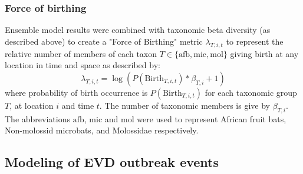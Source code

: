 \documentclass[9pt,twoside,lineno]{pnas-new}
\newcommand{\afb}{\mathrm{afb}}
\newcommand{\mic}{\mathrm{mic}}
\newcommand{\mol}{\mathrm{mol}}
\begin{document}
\subsubsection*{Force of birthing}
Ensemble model results were combined with taxonomic beta diversity (as described above) to create a "Force of Birthing" metric $\lambda_{T,i,t}$ to represent the relative number of members of each taxon $T \in \{\afb, \mic, \mol\}$ giving birth at any location in time and space as described by:
\[
  	    \lambda_{T,i,t} = \log(P(\mathrm{Birth}_{T,i,t})*\beta_{T,i} +1)
\]
where probability of birth occurrence is $P(\mathrm{Birth}_{T,i,t})$ for each taxonomic group $T$, at location $i$ and time $t$. The number of taxonomic members is give by $\beta_{T,i}$. The abbreviations $\afb$, $\mic$ and $\mol$ were used to represent African fruit bats, Non-molossid microbats, and Molossidae respectively. \par 
\subsection*{Modeling of EVD outbreak events}
\label{spatGLM}
\end{document}
